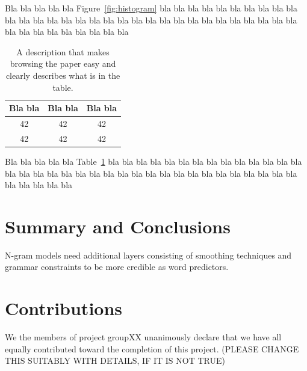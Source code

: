 \documentclass[a4paper,12pt]{article}
\begin{document}
Bla bla bla bla bla Figure~\ref{fig:histogram} bla bla bla bla bla bla 
bla bla bla bla bla bla bla bla bla bla bla bla bla bla bla bla bla 
bla bla bla bla bla bla bla bla bla bla bla bla bla bla bla bla bla 

\begin{table}
\begin{center}
\begin{tabular}{|c|c|c|}
\hline
Bla bla & Bla bla & Bla bla \\ \hline
42 & 42 & 42 \\ \hline
42 & 42 & 42 \\ \hline
\end{tabular}
\caption{A description that makes browsing the paper easy and clearly 
describes what is in the table.}
\label{tab:results}
\end{center}
\end{table}

Bla bla bla bla bla Table~\ref{tab:results} bla bla bla bla bla bla 
bla bla bla bla bla bla bla bla bla bla bla bla bla bla bla bla bla 
bla bla bla bla bla bla bla bla bla bla bla bla bla bla bla bla bla 

\section{Summary and Conclusions}
\label{sec:summary}

N-gram models need additional layers consisting of smoothing techniques and grammar constraints to be more credible as  word predictors.


\section{Contributions}
\label{sec:contributions}
We the members of project groupXX unanimously declare that 
we have all equally contributed toward the completion of this
project. (PLEASE CHANGE THIS SUITABLY WITH DETAILS, IF IT IS NOT TRUE)






\end{document}
